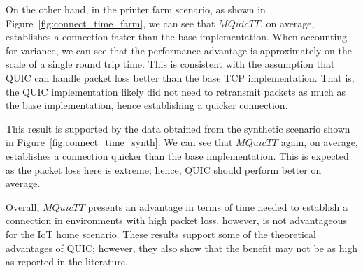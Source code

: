 On the other hand, in the printer farm scenario, as shown in Figure~\ref{fig:connect_time_farm}, we can see that $MQuicTT$, on average, establishes a connection faster than the base implementation.
When accounting for variance, we can see that the performance advantage is approximately on the scale of a single round trip time.
This is consistent with the assumption that QUIC can handle packet loss better than the base TCP implementation.
That is, the QUIC implementation likely did not need to retransmit packets as much as the base implementation, hence establishing a quicker connection.

This result is supported by the data obtained from the synthetic scenario shown in Figure~\ref{fig:connect_time_synth}.
We can see that $MQuicTT$ again, on average, establishes a connection quicker than the base implementation.
This is expected as the packet loss here is extreme; hence, QUIC should perform better on average.

Overall, $MQuicTT$ presents an advantage in terms of time needed to establish a connection in environments with high packet loss, however, is not advantageous for the IoT home scenario.
These results support some of the theoretical advantages of QUIC; however, they also show that the benefit may not be as high as reported in the literature.